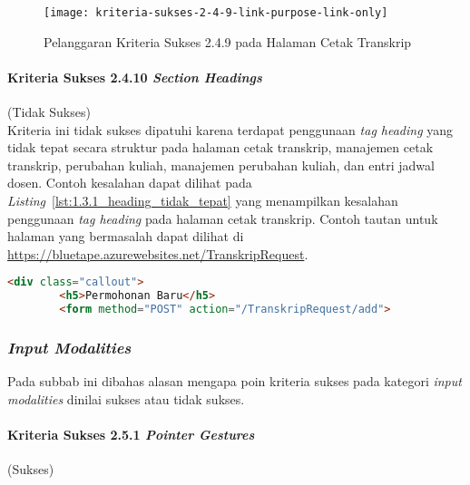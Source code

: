 \begin{figure}[H]
    \centering  
    \texttt{[image: kriteria-sukses-2-4-9-link-purpose-link-only]}  
    \caption[Pelanggaran Kriteria Sukses 2.4.9 pada Halaman Cetak Transkrip]{Pelanggaran Kriteria Sukses 2.4.9 pada Halaman Cetak Transkrip}
    \label{fig:2.4.9_link_purpose_link_only}  
\end{figure} 

\paragraph{Kriteria Sukses 2.4.10 \textit{Section Headings}}
\label{par:kepatuhan_bluetape_kriteria_sukses_2.4.10}
(Tidak Sukses)\\

Kriteria ini tidak sukses dipatuhi karena terdapat penggunaan \textit{tag heading} yang tidak tepat secara struktur pada halaman cetak transkrip, manajemen cetak transkrip, perubahan kuliah, manajemen perubahan kuliah, dan entri jadwal dosen. Contoh kesalahan dapat dilihat pada \mbox{\textit{Listing} \ref{lst:1.3.1_heading_tidak_tepat}} yang menampilkan kesalahan penggunaan \textit{tag heading} pada halaman cetak transkrip. Contoh tautan untuk halaman yang bermasalah dapat dilihat di \url{https://bluetape.azurewebsites.net/TranskripRequest}.

\begin{lstlisting}[frame=single, label={lst:2.4.10_heading_tidak_tepat}, language=HTML, caption=Pelanggaran Kriteria Sukses 2.4.10 pada Halaman Cetak Transkrip]
    <div class="callout">
        <h5>Permohonan Baru</h5>
        <form method="POST" action="/TranskripRequest/add">
\end{lstlisting}

\subsubsection{\textit{Input Modalities}}
\label{subsubsec:kepatuhan_bluetape_input_modalities}
Pada subbab ini dibahas alasan mengapa poin kriteria sukses pada kategori \textit{input modalities} dinilai sukses atau tidak sukses.

\paragraph{Kriteria Sukses 2.5.1 \textit{Pointer Gestures}}
\label{par:kepatuhan_bluetape_kriteria_sukses_2.5.1}
(Sukses)\\

